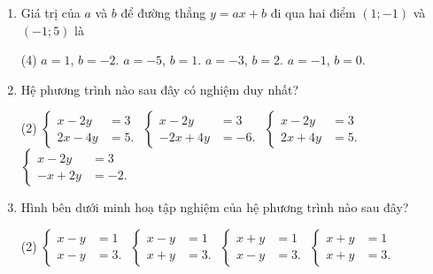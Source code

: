 \begin{practice}
\begin{enumerate}
        \item Giá trị của $a$ và $b$ để đường thẳng $y=ax+b$ đi qua hai điểm $(1;-1)$ và $(-1;5)$ là
        \begin{tasks}(4)
            \task $a=1$, $b=-2$.
            \task $a=-5$, $b=1$.
            \task $a=-3$, $b=2$.
            \task $a=-1$, $b=0$.
        \end{tasks}
        \par\noindent\answerbox\par

        \item Hệ phương trình nào sau đây có nghiệm duy nhất?
        \begin{tasks}(2)
            \task $\left\{\begin{aligned}x-2y&=3\\2x-4y&=5.\end{aligned}\right.$
            \task $\left\{\begin{aligned}x-2y&=3\\-2x+4y&=-6.\end{aligned}\right.$
            \task $\left\{\begin{aligned}x-2y&=3\\2x+4y&=5.\end{aligned}\right.$
            \task $\left\{\begin{aligned}x-2y&=3\\-x+2y&=-2.\end{aligned}\right.$
        \end{tasks}
        \par\noindent\answerbox\par

        \item Hình bên dưới minh hoạ tập nghiệm của hệ phương trình nào sau đây?
        \begin{tasks}(2)
            \task $\left\{\begin{aligned}x-y&=1\\x-y&=3.\end{aligned}\right.$
            \task $\left\{\begin{aligned}x-y&=1\\x+y&=3.\end{aligned}\right.$
            \task $\left\{\begin{aligned}x+y&=1\\x-y&=3.\end{aligned}\right.$
            \task $\left\{\begin{aligned}x+y&=1\\x+y&=3.\end{aligned}\right.$
        \end{tasks}


\end{enumerate}
\end{practice}

